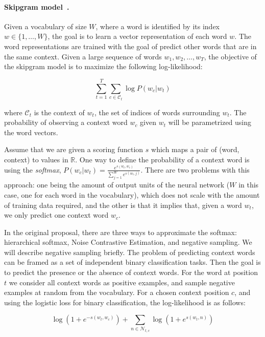 \paragraph{Skipgram model~\cite{mikolov2013efficient}.}
%
Given a vocabulary of size $W$, where a word is identified by its index $w \in
\{1, \ldots, W\}$, the goal is to learn a vector representation of each word $w$.
%
The word representations are trained with the goal of predict other words that
are in the same context.
%
Given a large sequence of words $w_1, w_2, \ldots, w_T$, the objective of the
skipgram model is to maximize the following log-likelihood:

$$ \sum_{t=1}^T\sum_{c\in \mathcal{C}_t} \log P(w_c | w_t) $$

\noindent where $\mathcal{C}_t$ is the context of $w_t$, the set of indices of
words surrounding $w_t$. 
%
The probability of observing a context word $w_c$ given $w_t$ will be
parametrized using the word vectors.


Assume that we are given a scoring function $s$ which maps a pair of (word,
context) to values in $\mathbb{R}$.
%
One way to define the probability of a context word is using the {\em softmax},
$ P(w_c | w_t) = \frac{ \mathit{e}^{s(w_t, w_c)} }{ \sum_{j=1}^W \mathit{e}^{s(w_t, j)} } $.
%
There are two problems with this approach: one being the amount of output units
of the neural network ($W$ in this case, one for each word in the vocabulary),
which does not scale with the amount of training data required, and the other is
that it implies that, given a word $w_t$, we only predict one context word
$w_c$.


In the original proposal, there are three ways to approximate the softmax:
%
hierarchical softmax,
%
Noise Contrastive Estimation, and
%
negative sampling.
%
We will describe negative sampling briefly.
% 
The problem of predicting context words can be framed as a set of independent
binary classification tasks.
%
Then the goal is to predict the presence or the absence of context words. 
%
For the word at position $t$ we consider all context words as positive examples,
and sample negative examples at random from the vocabulary.
%
For a chosen context position $c$, and using the logistic loss for binary
classification, the log-likelihood is as follows:

$$ \log (1 + \mathit{e}^{-s(w_t, w_c)}) + \sum_{n\in \mathcal{N}_{t,c}} \log(1 + \mathit{e}^{s(w_t, n)})$$

